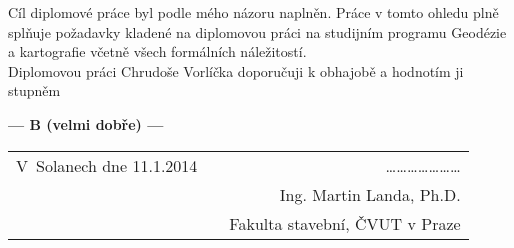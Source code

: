 \documentclass[czech,11pt,a4paper]{article}
\begin{document}
Cíl diplomové práce byl podle mého názoru naplněn. Práce v tomto
ohledu plně splňuje požadavky kladené na diplomovou práci na studijním
programu Geodézie a kartografie včetně všech formálních náležitostí.
\\

Diplomovou práci Chrudoše Vorlíčka doporučuji k obhajobě a hodnotím ji
stu\-pněm

\begin{center}
{\bf --- B (velmi dobře)  ---}
\end{center}

\vspace{1.2cm}

\noindent \begin{tabular}{lp{}r}
V~Solanech dne 11.1.2014 & & \ldots\ldots\ldots\ldots\ldots\ldots\ldots \\
& & Ing. Martin Landa, Ph.D. \\
& & Fakulta stavební, ČVUT v Praze \\
\end{tabular}
\end{document}
